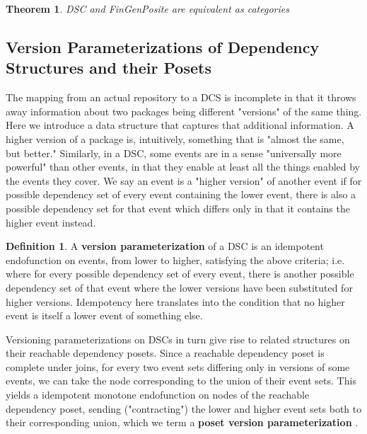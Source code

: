 \documentclass[hoptionsi,review,format=acmsmall]{acmart}
\newtheorem{theorem}{Theorem}[section]
\theoremstyle{definition}
\newtheorem{definition}{Definition}[section]
\begin{document}
\begin{theorem}
DSC and FinGenPosite are equivalent as categories
\end{theorem}







\subsection{Version Parameterizations of Dependency Structures and their Posets}

The mapping from an actual repository to a DCS is incomplete in that it throws away information about two packages being different "versions" of the same thing. Here we introduce a data structure that captures that additional information. A higher version of a package is, intuitively, something that is "almost the same, but better." Similarly, in a DSC, some events are in a sense "universally more powerful" than other events, in that they enable at least all the things enabled by the events they cover. We say an event is a "higher version" of another event if for possible dependency set of every event containing the lower event, there is also a possible dependency set for that event which differs only in that it contains the higher event instead.

\begin{definition}
A \textbf{version parameterization} of a DSC is an idempotent endofunction on events, from lower to higher, satisfying the above criteria; i.e. where for every possible dependency set of every event, there is another possible dependency set of that event where the lower versions have been substituted for higher versions. Idempotency here translates into the condition that no higher event is itself a lower event of something else.
\end{definition}

Versioning parameterizations on DSCs in turn give rise to related structures on their reachable dependency posets. Since a reachable dependency poset is complete under joins, for every two event sets differing only in versions of some events, we can take the node corresponding to the union of their event sets. This yields a idempotent monotone endofunction on nodes of the reachable dependency poset, sending ("contracting") the lower and higher event sets both to their corresponding union, which we term a \textbf{poset version parameterization} .
\end{document}
